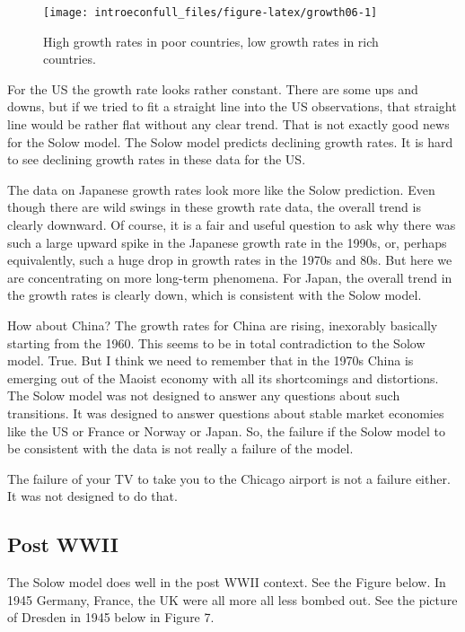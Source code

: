 \documentclass[
]{book}
\begin{document}
\begin{figure}

{\centering \texttt{[image: introeconfull\_files/figure-latex/growth06-1]} 

}

\caption{High growth rates in poor countries, low growth rates in rich countries.}\label{fig:growth06}
\end{figure}

For the US the growth rate looks rather constant. There are some ups and downs, but if we tried to fit a straight line into the US observations, that straight line would be rather flat without any clear trend. That is not exactly good news for the Solow model. The Solow model predicts declining growth rates. It is hard to see declining growth rates in these data for the US.

The data on Japanese growth rates look more like the Solow prediction. Even though there are wild swings in these growth rate data, the overall trend is clearly downward. Of course, it is a fair and useful question to ask why there was such a large upward spike in the Japanese growth rate in the 1990s, or, perhaps equivalently, such a huge drop in growth rates in the 1970s and 80s. But here we are concentrating on more long-term phenomena. For Japan, the overall trend in the growth rates is clearly down, which is consistent with the Solow model.

How about China? The growth rates for China are rising, inexorably basically starting from the 1960. This seems to be in total contradiction to the Solow model. True. But I think we need to remember that in the 1970s China is emerging out of the Maoist economy with all its shortcomings and distortions. The Solow model was not designed to answer any questions about such transitions. It was designed to answer questions about stable market economies like the US or France or Norway or Japan. So, the failure if the Solow model to be consistent with the data is not really a failure of the model.

The failure of your TV to take you to the Chicago airport is not a failure either. It was not designed to do that.

\hypertarget{post-wwii}{%
\subsection{Post WWII}\label{post-wwii}}

The Solow model does well in the post WWII context. See the Figure below. In 1945 Germany, France, the UK were all more all less bombed out. See the picture of Dresden in 1945 below in Figure 7.
\end{document}
